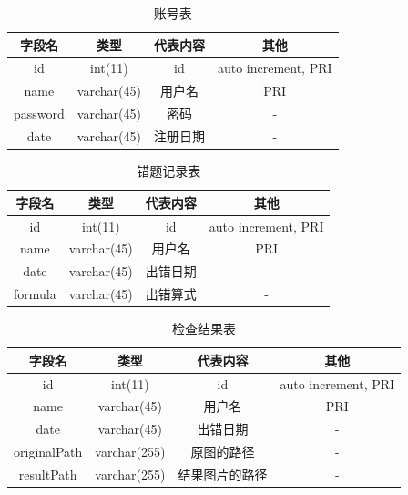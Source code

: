 \begin{table}[h!]
\begin{center}
\caption{账号表}
\begin{tabular}{|c|c|c|c|}
 \hline
 字段名 & 类型 & 代表内容 & 其他\\
 \hline
id & int(11) & id & auto increment, PRI \\
 \hline
name & varchar(45) & 用户名 & PRI \\
 \hline
password & varchar(45) & 密码 & - \\
  \hline
 date & varchar(45) & 注册日期 & - \\
  \hline
\end{tabular}
\end{center}
\end{table}
\par

\begin{table}[h!]
\begin{center}
\caption{错题记录表}
\begin{tabular}{|c|c|c|c|}
 \hline
 字段名 & 类型 & 代表内容 & 其他\\
 \hline
id & int(11) & id & auto increment, PRI \\
 \hline
name & varchar(45) & 用户名 & PRI \\
 \hline
 date & varchar(45) &  出错日期 & - \\
  \hline
  formula & varchar(45) & 出错算式 & - \\
  \hline
\end{tabular}
\end{center}
\end{table}
\par

\begin{table}[h!]
\begin{center}
\caption{检查结果表}
\begin{tabular}{|c|c|c|c|}
 \hline
 字段名 & 类型 & 代表内容 & 其他\\
 \hline
id & int(11) & id & auto increment, PRI \\
 \hline
name & varchar(45) & 用户名 & PRI \\
 \hline
 date & varchar(45) & 出错日期 & - \\
  \hline
  originalPath & varchar(255) & 原图的路径 & - \\
  \hline
   resultPath & varchar(255) & 结果图片的路径 & - \\
  \hline
\end{tabular}
\end{center}
\end{table}
\par

